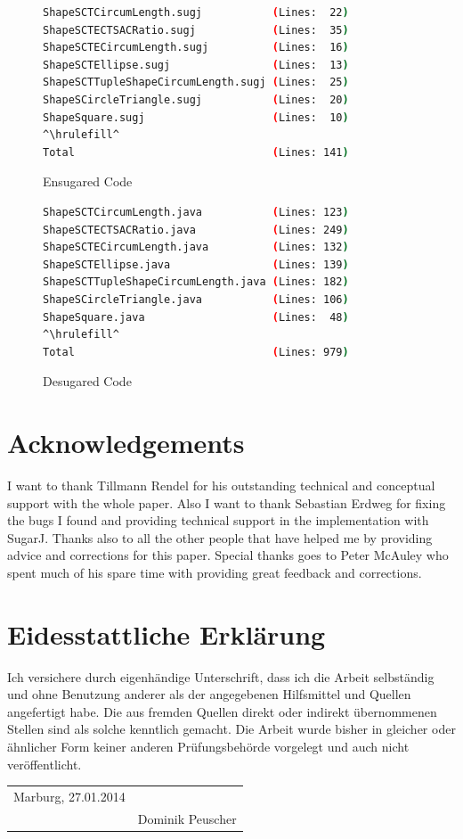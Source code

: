 \documentclass{report}
\begin{document}
\begin{figure}[h]
\begin{lstlisting}[language=bash,numbers=none]
ShapeSCTCircumLength.sugj           (Lines:  22)
ShapeSCTECTSACRatio.sugj            (Lines:  35)
ShapeSCTECircumLength.sugj          (Lines:  16)
ShapeSCTEllipse.sugj                (Lines:  13)
ShapeSCTTupleShapeCircumLength.sugj (Lines:  25)
ShapeSCircleTriangle.sugj           (Lines:  20)
ShapeSquare.sugj                    (Lines:  10)
^\hrulefill^
Total                               (Lines: 141)
\end{lstlisting}
\caption{Ensugared Code}
\label{useCaseEnsugaredCode}
\end{figure}

\begin{figure}[h]
\begin{lstlisting}[language=bash,numbers=none]
ShapeSCTCircumLength.java           (Lines: 123)
ShapeSCTECTSACRatio.java            (Lines: 249)
ShapeSCTECircumLength.java          (Lines: 132)
ShapeSCTEllipse.java                (Lines: 139)
ShapeSCTTupleShapeCircumLength.java (Lines: 182)
ShapeSCircleTriangle.java           (Lines: 106)
ShapeSquare.java                    (Lines:  48)
^\hrulefill^
Total                               (Lines: 979)
\end{lstlisting}
\caption{Desugared Code}
\label{useCaseDesugaredCode}
\end{figure}

\chapter*{Acknowledgements}
I want to thank Tillmann Rendel for his outstanding technical and conceptual support with the whole paper. Also I want to thank Sebastian Erdweg for fixing the bugs I found and providing technical support in the implementation with SugarJ. Thanks also to all the other people that have helped me by providing advice and corrections for this paper. Special thanks goes to Peter McAuley who spent much of his spare time with providing great feedback and corrections.

\listoffigures
{}




\chapter*{Eidesstattliche Erkl\"{a}rung}
Ich versichere durch eigenhändige Unterschrift, dass ich die Arbeit selbst\"{a}ndig und ohne Benutzung anderer als der angegebenen Hilfsmittel und Quellen angefertigt habe. Die aus fremden Quellen direkt oder indirekt \"{u}bernommenen Stellen sind als solche kenntlich gemacht.
Die Arbeit wurde bisher in gleicher oder \"{a}hnlicher Form keiner anderen Pr\"{u}fungsbeh\"{o}rde vorgelegt und auch nicht ver\"{o}ffentlicht.\\

\centering
\vspace{5 cm}
 
\begin{tabular}{L{6cm}C{6cm}}
Marburg, 27.01.2014 & \hrulefill \\ 
& Dominik Peuscher 
\end{tabular}%
\end{document}
